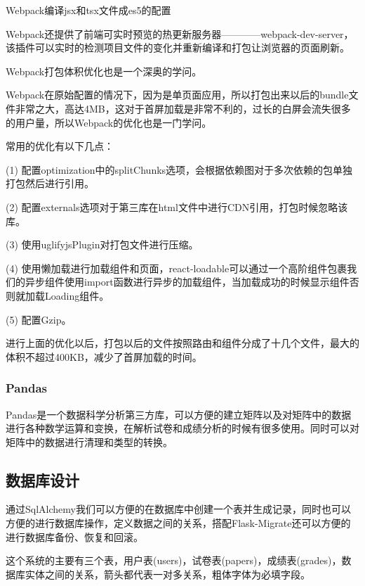 \begin{center}
	{\small Webpack编译jsx和tsx文件成es5的配置}
\end{center}

Webpack还提供了前端可实时预览的热更新服务器————webpack-dev-server，该插件可以实时的检测项目文件的变化并重新编译和打包让浏览器的页面刷新。

Webpack打包体积优化也是一个深奥的学问。

Webpack在原始配置的情况下，因为是单页面应用，所以打包出来以后的bundle文件非常之大，高达4MB，这对于首屏加载是非常不利的，过长的白屏会流失很多的用户量，所以Webpack的优化也是一门学问。

常用的优化有以下几点：

(1) 配置optimization中的splitChunks选项，会根据依赖图对于多次依赖的包单独打包然后进行引用。

(2) 配置externals选项对于第三库在html文件中进行CDN引用，打包时候忽略该库。

(3) 使用uglifyjsPlugin对打包文件进行压缩。

(4) 使用懒加载进行加载组件和页面，react-loadable可以通过一个高阶组件包裹我们的异步组件使用import函数进行异步的加载组件，当加载成功的时候显示组件否则就加载Loading组件。

(5) 配置Gzip。

进行上面的优化以后，打包以后的文件按照路由和组件分成了十几个文件，最大的体积不超过400KB，减少了首屏加载的时间。

\subsubsection{Pandas}

Pandas是一个数据科学分析第三方库，可以方便的建立矩阵以及对矩阵中的数据进行各种数学运算和变换，在解析试卷和成绩分析的时候有很多使用。同时可以对矩阵中的数据进行清理和类型的转换。

\subsection{数据库设计}

通过SqlAlchemy我们可以方便的在数据库中创建一个表并生成记录，同时也可以方便的进行数据库操作，定义数据之间的关系，搭配Flask-Migrate还可以方便的进行数据库备份、恢复和回滚。

这个系统的主要有三个表，用户表(users)，试卷表(papers)，成绩表(grades)，数据库实体之间的关系，箭头都代表一对多关系，粗体字体为必填字段。

